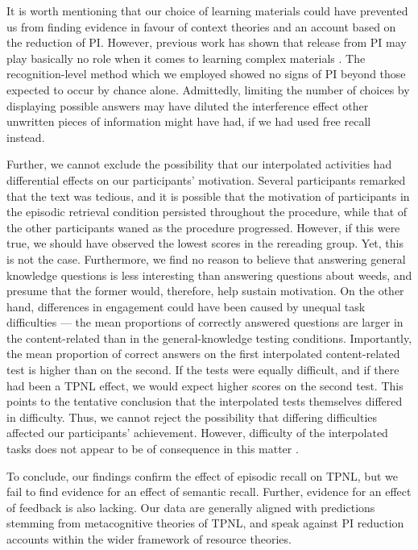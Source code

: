 \documentclass[../main.tex]{subfiles}
\begin{document}
It is worth mentioning that our choice of learning materials could have 
prevented us from finding evidence in favour of context theories and an 
account based on the reduction of PI. However, previous work has shown that 
release from PI may play basically no role when it comes to learning complex 
materials \citep{divisRetrievalSpeedsContext2014, 
wissmanInterimTestEffect2011}. The recognition-level method which we 
employed showed no signs of PI beyond those expected to occur by chance 
alone. Admittedly, limiting the number of choices by displaying possible 
answers may have diluted the interference effect other unwritten pieces of 
information might have had, if we had used free recall instead.

Further, we cannot exclude the possibility that our interpolated activities 
had differential effects on our participants’ motivation. Several  
participants remarked that the text was tedious, and it is possible that the 
motivation of participants in the episodic retrieval condition persisted 
throughout the procedure, while that of the other participants waned as the 
procedure progressed. However, if this were true, we should have observed 
the lowest scores in the rereading group. Yet, this is not the case. 
Furthermore, we find no reason to believe that answering general knowledge 
questions is less interesting than answering questions about weeds, and 
presume that the former would, therefore, help sustain motivation. On the 
other hand, differences in engagement could have been caused by unequal task 
difficulties — the mean proportions of correctly answered questions are 
larger in the content-related than in the general-knowledge testing 
conditions. Importantly, the mean proportion of correct answers on the first 
interpolated content-related test is higher than on the second. If the tests 
were equally difficult, and if there had been a TPNL effect, we would expect 
higher scores on the second test. This points to the tentative conclusion 
that the interpolated tests themselves differed in difficulty. Thus, we 
cannot reject the possibility that differing difficulties affected our 
participants’ achievement. However, difficulty of the interpolated tasks 
does not appear to be of consequence in this matter 
\citep{divisRetrievalSpeedsContext2014, 
pastotterRetrievalLearningFacilitates2011, 
sahakyanContextChangeRetrieval2012}.

To conclude, our findings confirm the effect of episodic recall on TPNL, but 
we fail to find evidence for an effect of semantic recall. Further, evidence 
for an effect of feedback is also lacking. Our data are generally aligned 
with predictions stemming from metacognitive theories of TPNL, and speak 
against PI reduction accounts within the wider framework of resource 
theories.
\end{document}
